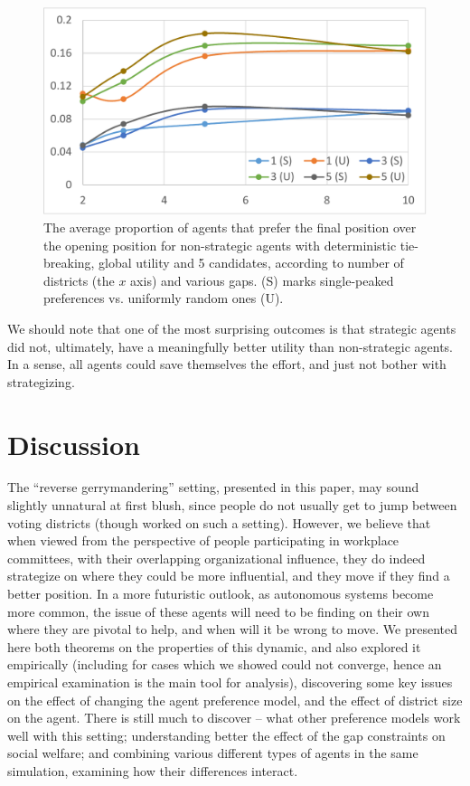\documentclass[letterpaper]{article} %
\begin{document}
\begin{figure}
	\centering
	\includegraphics[width=\columnwidth]{by_gap_by_sp_rev_stats_agent_util_imp_v_53_tb_True_st_False_gr_True_can_5_N_1000_new.pdf}
	\caption{The average proportion of agents that prefer the final position over the opening position 
		 for non-strategic agents with deterministic tie-breaking, global utility and 5 candidates, according to number of districts (the $x$ axis) and various gaps. (S) marks single-peaked preferences vs. uniformly random ones (U).}
	\label{fig:SPGlob}
\end{figure}

We should note that one of the most surprising outcomes is that strategic agents did not, ultimately, have a meaningfully better utility than non-strategic agents. In a sense, all agents could save themselves the effort, and just not bother with strategizing.

\section{Discussion}

The ``reverse gerrymandering'' setting, presented in this paper, may sound slightly unnatural at first blush, since people do not usually get to jump between voting districts (though \cite{BM12} worked on such a setting). However, we believe that when viewed from the perspective of people participating in workplace committees, with their overlapping organizational influence, they do indeed strategize on where they could be more influential, and they move if they find a better position. In a more futuristic outlook, as autonomous systems become more common, the issue of these agents will need to be finding on their own where they are pivotal to help, and when will it be wrong to move.
We presented here both theorems on the properties of this dynamic, and also explored it empirically (including for cases which we showed could not converge, hence an empirical examination is the main tool for analysis), discovering some key issues on the effect of changing the agent preference model, and the effect of district size on the agent. There is still much to discover -- what other preference models work well with this setting; understanding better the effect of the gap constraints on social welfare; and combining various different types of agents in the same simulation, examining how their differences interact.
\end{document}
